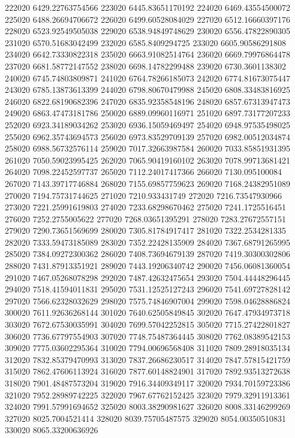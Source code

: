 {222020 6429.22763754566
223020 6445.83651170192
224020 6469.43554500072
225020 6488.26694706672
226020 6499.60528084029
227020 6512.16660397176
228020 6523.92549505038
229020 6538.94849748629
230020 6556.47822890305
231020 6570.51683042499
232020 6585.8409294725
233020 6605.90586291808
234020 6642.73330822318
235020 6663.91082514764
236020 6669.79976864478
237020 6681.58772147552
238020 6698.14782299488
239020 6730.3601138302
240020 6745.74803809871
241020 6764.78266185073
242020 6774.81673075447
243020 6785.13873613399
244020 6798.80670479988
245020 6808.33483816925
246020 6822.68190682396
247020 6835.92358548196
248020 6857.67313947473
249020 6863.47473181786
250020 6889.09960116971
251020 6897.73177207233
252020 6923.34189034262
253020 6936.15059469497
254020 6948.97535498025
255020 6962.35743694573
256020 6973.83529709139
257020 6982.00512034874
258020 6988.56732576114
259020 7017.32663987584
260020 7033.85851931395
261020 7050.59023995425
262020 7065.90419160102
263020 7078.99713681421
264020 7098.22452597737
265020 7112.24017417366
266020 7130.095100084
267020 7143.39717746884
268020 7155.69857759623
269020 7168.24382951089
270020 7194.75731744625
271020 7210.933431749
272020 7216.73547930966
273020 7221.25991619803
274020 7233.68298670462
275020 7241.1725516451
276020 7252.2755005622
277020 7268.03651395291
278020 7283.27672557151
279020 7290.73651569699
280020 7305.81784917417
281020 7322.2534281335
282020 7333.59473185089
283020 7352.22428135909
284020 7367.68791265995
285020 7384.09272300362
286020 7408.73694679139
287020 7419.30300302806
288020 7431.87913351921
289020 7443.19206340742
290020 7456.06081360054
291020 7467.05268078298
292020 7487.42632475654
293020 7504.44448296445
294020 7518.41594011831
295020 7531.12525127243
296020 7541.69727828142
297020 7566.62328032629
298020 7575.74846907004
299020 7598.04628886824
300020 7611.92636268144
301020 7640.62505849845
302020 7647.47934973718
303020 7672.67530035991
304020 7699.57042252815
305020 7715.27422801827
306020 7736.67797554903
307020 7748.75487364445
308020 7762.08389542153
309020 7775.03602295364
310020 7794.00696568408
311020 7809.28918035134
312020 7832.85379470993
313020 7837.26686230517
314020 7847.57815421759
315020 7862.47606113924
316020 7877.60148824901
317020 7892.93513272638
318020 7901.48487573204
319020 7916.34409349117
320020 7934.70159723386
321020 7952.28989742225
322020 7967.67762152425
323020 7979.32911913361
324020 7991.57991694652
325020 8003.38290981627
326020 8008.33146299269
327020 8025.7004521414
328020 8039.75705487575
329020 8054.00350510831
330020 8065.33200636926
}
